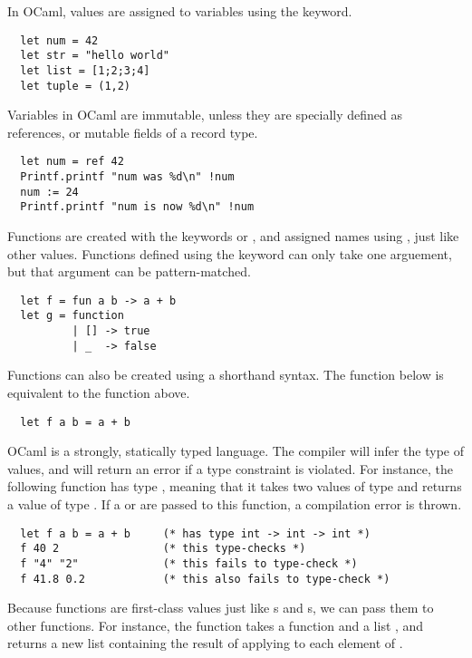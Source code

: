 In OCaml, values are assigned to variables using the 
keyword.

\begin{lstlisting}
  let num = 42
  let str = "hello world"
  let list = [1;2;3;4]
  let tuple = (1,2)
\end{lstlisting}

Variables in OCaml are immutable, unless they are specially defined as
references, or mutable fields of a record type.

\begin{lstlisting}
  let num = ref 42
  Printf.printf "num was %d\n" !num
  num := 24
  Printf.printf "num is now %d\n" !num
\end{lstlisting}

Functions are created with the keywords  or ,
and assigned names using , just like other values. Functions
defined using the  keyword can only take one arguement,
but that argument can be pattern-matched.

\begin{lstlisting}
  let f = fun a b -> a + b
  let g = function
          | [] -> true
          | _  -> false
\end{lstlisting}

Functions can also be created using a shorthand  syntax. The
function  below is equivalent to the function  above.

\begin{lstlisting}
  let f a b = a + b
\end{lstlisting}

OCaml is a strongly, statically typed language. The compiler will
infer the type of values, and will return an error if a type
constraint is violated. For instance, the following function 
has type , meaning that it takes two values of
type  and returns a value of type . If a
 or  are passed to this function, a
compilation error is thrown.

\begin{lstlisting}
  let f a b = a + b     (* has type int -> int -> int *)
  f 40 2                (* this type-checks *)
  f "4" "2"             (* this fails to type-check *)
  f 41.8 0.2            (* this also fails to type-check *)
\end{lstlisting}

Because functions are first-class values just like s and
s, we can pass them to other functions. For instance, the
function  takes a function  and a list
, and returns a new list containing the result of applying
 to each element of .

